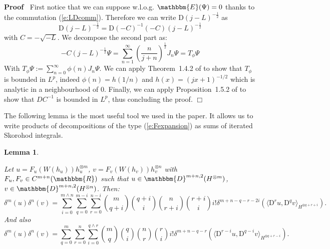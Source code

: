 \documentclass[a4paper,11pt]{article}
\newcommand{\assign}{:=}
\newcommand{\mathD}{\mathrm{D}}
\newenvironment{proof}{\noindent\textbf{Proof\ }}{\hspace*{\fill}$\Box$\medskip}
\newtheorem{lemma}[theorem]{Lemma}
{\theorembodyfont{\rmfamily}\newtheorem{remark}[theorem]{Remark}}
\begin{document}
\begin{proof}
  First notice that we can suppose w.l.o.g. $\mathbbm{E} (\Psi) = 0$ thanks to
  the commutation (\ref{e:LDcomm}). Therefore we can write $\mathD (j - L)^{-
  \frac{1}{2}}$ as
  \[ \mathD (j - L)^{- \frac{1}{2}} = \mathD (- C)^{- 1} (- C)  (j - L)^{-
     \frac{1}{2}} \]
  with $C = - \sqrt{- L}$. We decompose the second part as:
  \[ - C (j - L)^{- \frac{1}{2}} \Psi = \sum_{n = 1}^{\infty} \left(
     \frac{n}{j + n} \right)^{\frac{1}{2}} J_n \Psi = T_{\phi} \Psi \]
  With $T_{\phi} \Psi \assign \sum_{n = 0}^{\infty} \phi (n) J_n \Psi$. We can
  apply Theorem~1.4.2 of {\cite{nualart_2006}} to show that $T_{\phi}$ is
  bounded in $L^p$, indeed $\phi (n) = h (1 / n)$ and $h (x) = (jx + 1)^{- 1 /
  2}$ which is analytic in a neighbourhood of 0. Finally, we can apply
  Proposition~1.5.2 of {\cite{nualart_2006}} to show that $D C^{- 1}$ is
  bounded in $L^p$, thus concluding the proof.
\end{proof}

The following lemma is the most useful tool we used in the paper. It allows us
to write products of decompositions of the type (\ref{e:Fexpansion}) as sums
of iterated Skorohod integrals.

\begin{lemma}
  \label{l:productformula}
  
  Let $u = F_u (W (h_u)) h^{\otimes m}_u$, $v = F_v (W (h_v)) h^{\otimes
  n}_v$ with $F_u, F_v \in C^{m + n} (\mathbbm{R})$ such that $u \in
  \mathbbm{D}^{m + n, 2} (H^{\otimes m})$, $v \in \mathbbm{D}^{m + n, 2}
  (H^{\otimes n})$. Then:
  \begin{equation}
    \delta^m (u) \delta^n (v) = \sum^{m \wedge n}_{i = 0} \sum_{q = 0}^{m - i}
    \sum_{r = 0}^{n - i} \binom{m}{q + i} \binom{q + i}{i} \binom{n}{r + i}
    \binom{r + i}{i} i! \delta^{m + n - q - r - 2 i} (\langle \mathD^r u,
    \mathD^q v \rangle_{H^{\otimes q + r + i}}) .
  \end{equation}
  And also
  \begin{equation}
    \delta^m (u) \delta^n (v) = \sum_{q = 0}^m \sum_{r = 0}^n \sum_{i = 0}^{q
    \wedge r} \binom{m}{q} \binom{q}{i} \binom{n}{r} \binom{r}{i} i! \delta^{m
    + n - q - r} (\langle \mathD^{r - i} u, \mathD^{q - i} v
    \rangle_{H^{\otimes q + r - i}}) . \label{e:productformula-variant}
  \end{equation}
\end{lemma}
\end{document}
